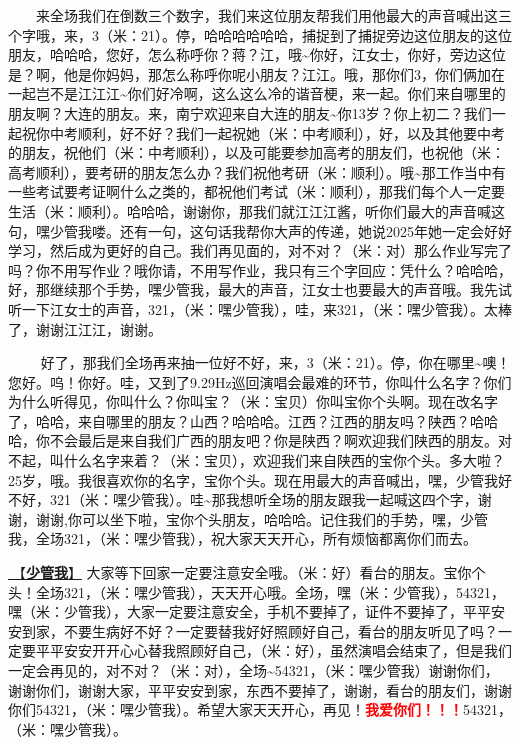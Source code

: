 \documentclass[]{ctexbook}
\begin{document}
  来全场我们在倒数三个数字，我们来这位朋友帮我们用他最大的声音喊出这三个字哦，来，3（米：21）。停，哈哈哈哈哈哈，捕捉到了捕捉旁边这位朋友的这位朋友，哈哈哈，您好，怎么称呼你？蒋？江，哦\textasciitilde 你好，江女士，你好，旁边这位是？啊，他是你妈妈，那怎么称呼你呢小朋友？江江。哦，那你们3，你们俩加在一起岂不是江江江\textasciitilde 你们好冷啊，这么这么冷的谐音梗，来一起。你们来自哪里的朋友啊？大连的朋友。来，南宁欢迎来自大连的朋友\textasciitilde 你13岁？你上初二？我们一起祝你中考顺利，好不好？我们一起祝她（米：中考顺利），好，以及其他要中考的朋友，祝他们（米：中考顺利），以及可能要参加高考的朋友们，也祝他（米：高考顺利），要考研的朋友怎么办？我们祝他考研（米：顺利）。哦\textasciitilde 那工作当中有一些考试要考证啊什么之类的，都祝他们考试（米：顺利），那我们每个人一定要生活（米：顺利）。哈哈哈，谢谢你，那我们就江江江酱，听你们最大的声音喊这句，嘿少管我喽。还有一句，这句话我帮你大声的传递，她说2025年她一定会好好学习，然后成为更好的自己。我们再见面的，对不对？（米：对）那么作业写完了吗？你不用写作业？哦你请，不用写作业，我只有三个字回应：凭什么？哈哈哈，好，那继续那个手势，嘿少管我，最大的声音，江女士也要最大的声音哦。我先试听一下江女士的声音，321，（米：嘿少管我），哇，来321，（米：嘿少管我）。太棒了，谢谢江江江，谢谢。

   好了，那我们全场再来抽一位好不好，来，3（米：21）。停，你在哪里\textasciitilde 噢！您好。呜！你好。哇，又到了9.29Hz巡回演唱会最难的环节，你叫什么名字？你们为什么听得见，你叫什么？你叫宝？（米：宝贝）你叫宝你个头啊。现在改名字了，哈哈，来自哪里的朋友？山西？哈哈哈。江西？江西的朋友吗？陕西？哈哈哈，你不会最后是来自我们广西的朋友吧？你是陕西？啊欢迎我们陕西的朋友。对不起，叫什么名字来着？（米：宝贝），欢迎我们来自陕西的宝你个头。多大啦？25岁，哦。我很喜欢你的名字，宝你个头。现在用最大的声音喊出，嘿，少管我好不好，321（米：嘿少管我）。哇\textasciitilde 那我想听全场的朋友跟我一起喊这四个字，谢谢，谢谢,你可以坐下啦，宝你个头朋友，哈哈哈。记住我们的手势，嘿，少管我，全场321，（米：嘿少管我），祝大家天天开心，所有烦恼都离你们而去。

\hyperref[watch-ur-manners]{🎵【\textbf{少管我}】} 大家等下回家一定要注意安全哦。（米：好）看台的朋友。宝你个头！全场321，（米：嘿少管我），天天开心哦。全场，嘿（米：少管我），54321，嘿（米：少管我），大家一定要注意安全，手机不要掉了，证件不要掉了，平平安安到家，不要生病好不好？一定要替我好好照顾好自己，看台的朋友听见了吗？一定要平平安安开开心心替我照顾好自己，（米：好），虽然演唱会结束了，但是我们一定会再见的，对不对？（米：对），全场\textasciitilde54321，（米：嘿少管我）谢谢你们，谢谢你们，谢谢大家，平平安安到家，东西不要掉了，谢谢，看台的朋友们，谢谢你们54321，（米：嘿少管我）。希望大家天天开心，再见！\textbf{\textcolor{red}{我爱你们！！！}}54321，（米：嘿少管我）。
\end{document}
